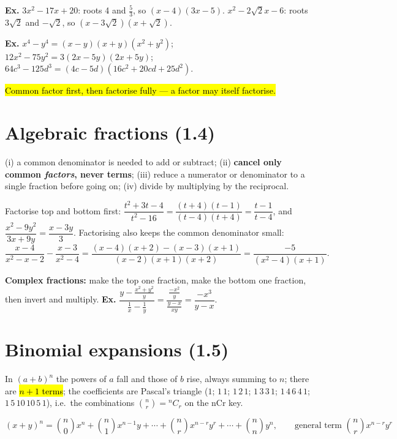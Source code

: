 \documentclass[11pt]{article}
\newcommand{\key}[1]{\hl{#1}}
\newcommand{\keyin}[1]{\textbf{\color{lilacdeep}#1}}  %
\newcommand{\wex}[1]{{\color{lilacdeep}\textbf{Ex.}} #1}
\begin{document}
\wex{$3x^{2}-17x+20$: roots 4 and $\frac53$, so $(x-4)(3x-5)$. \quad $x^{2}-2\sqrt2x-6$: roots $3\sqrt2$ and $-\sqrt2$, so $(x-3\sqrt2)(x+\sqrt2)$.}

\wex{$x^{4}-y^{4}=(x-y)(x+y)(x^{2}+y^{2})$; \ $12x^{2}-75y^{2}=3(2x-5y)(2x+5y)$; \ $64c^{3}-125d^{3}=(4c-5d)(16c^{2}+20cd+25d^{2})$.}

\key{Common factor first, then factorise fully --- a factor may itself factorise.}

\section{Algebraic fractions (1.4)}

\begin{formulabox}
(i) a common denominator is needed to add or subtract; (ii) \keyin{cancel only common \emph{factors}, never terms}; (iii) reduce a numerator or denominator to a single fraction before going on; (iv) divide by multiplying by the reciprocal.
\end{formulabox}

Factorise top and bottom first: $\dfrac{t^{2}+3t-4}{t^{2}-16}=\dfrac{(t+4)(t-1)}{(t-4)(t+4)}=\dfrac{t-1}{t-4}$, and $\dfrac{x^{2}-9y^{2}}{3x+9y}=\dfrac{x-3y}{3}$. Factorising also keeps the common denominator small:
\[\frac{x-4}{x^{2}-x-2}-\frac{x-3}{x^{2}-4}=\frac{(x-4)(x+2)-(x-3)(x+1)}{(x-2)(x+1)(x+2)}=\frac{-5}{(x^{2}-4)(x+1)}.\]

\textbf{Complex fractions:} make the top one fraction, make the bottom one fraction, then invert and multiply.
\wex{$\dfrac{y-\frac{x^{2}+y^{2}}{y}}{\frac1x-\frac1y}=\dfrac{\frac{-x^{2}}{y}}{\frac{y-x}{xy}}=\dfrac{-x^{3}}{y-x}$.}

\section{Binomial expansions (1.5)}

In $(a+b)^{n}$ the powers of $a$ fall and those of $b$ rise, always summing to $n$; there are \key{\mbox{$n+1$} terms}; the coefficients are Pascal's triangle ($1$; $1\,1$; $1\,2\,1$; $1\,3\,3\,1$; $1\,4\,6\,4\,1$; $1\,5\,10\,10\,5\,1$), i.e.\ the combinations $\binom nr={}^nC_r$ on the \textsf{nCr} key.

\begin{formulabox}
\[(x+y)^{n}=\binom n0x^{n}+\binom n1x^{n-1}y+\cdots+\binom nrx^{n-r}y^{r}+\cdots+\binom nny^{n},
\qquad\text{general term } \binom nrx^{n-r}y^{r}\]
\end{formulabox}
\end{document}

